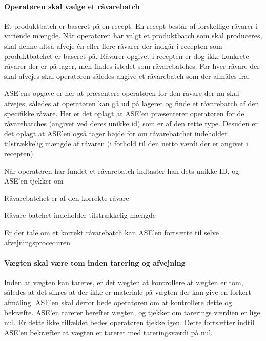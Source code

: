 \documentclass[a4paper]{article}
\newenvironment{my_enumerate}
{\begin{enumerate}
  \setlength{\itemsep}{1pt}
  \setlength{\parskip}{0pt}
  \setlength{\parsep}{0pt}}
{\end{enumerate}}
\begin{document}

\paragraph{Operatøren skal vælge et råvarebatch} %

Et produktbatch er baseret på en recept. En recept består af forskellige råvarer i variende mængde. Når operatøren har valgt et produktbatch som skal produceres, skal denne altså afveje én eller flere råvarer der indgår i recepten som produktbatchet er baseret på. Råvarer opgivet i recepten er dog ikke konkrete råvarer der er på lager, men findes istedet som råvarebatches. For hver råvare der skal afvejes skal operatøren således angive et råvarebatch som der afmåles fra.

ASE'ens opgave er her at præsentere operatøren for den råvare der nu skal afvejes, således at operatøren kan gå ud på lageret og finde et råvarebatch af den specifikke råvare. Her er det oplagt at ASE'en præsenterer operatøren for de råvarebatches (angivet ved deres unikke id) som er af den rette type. Desuden er det oplagt at ASE'en også tager højde for om råvarebatchet indeholder tilstrækkelig mængde af råvaren (i forhold til den netto værdi der er angivet i recepten).

Når operatøren har fundet et råvarebatch indtaster han dets unikke ID, og ASE'en tjekker om
\begin{my_enumerate}
  \item Råvarebatchet er af den korrekte råvare
  \item Råvare batchet indeholder tilstrækkelig mængde
\end{my_enumerate}

Er der tale om et korrekt råvarebatch kan ASE'en fortsætte til selve afvejningsproceduren


\paragraph{Vægten skal være tom inden tarering og afvejning} %

Inden at vægten kan tareres, er det vægten at kontrollere at vægten er tom, således at det sikres at der ikke er materiale på vægten der kan give en forkert afmåling. ASE'en skal derfor bede operatøren om at kontrollere dette og bekræfte. ASE'en tarerer herefter vægten, og tjekker om tarerings værdien er lige nul. Er dette ikke tilfældet bedes operatøren tjekke igen. Dette fortsætter indtil ASE'en bekræfter at vægten er tareret med tareringsværdi på nul.
\end{document}
